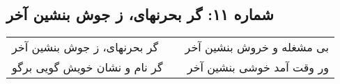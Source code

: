 \begin{center}
\section*{شماره ۱۱: گر بحرنهای، ز جوش بنشین آخر}
\label{sec:011}
\begin{longtable}{l p{0.5cm} r}
گر بحرنهای، ز جوش بنشین آخر
&&
بی مشغله و خروش بنشین آخر
\\
گر نام و نشان خویش گویی برگو
&&
ور وقت آمد خوشی بنشین آخر
\\
\end{longtable}
\end{center}
